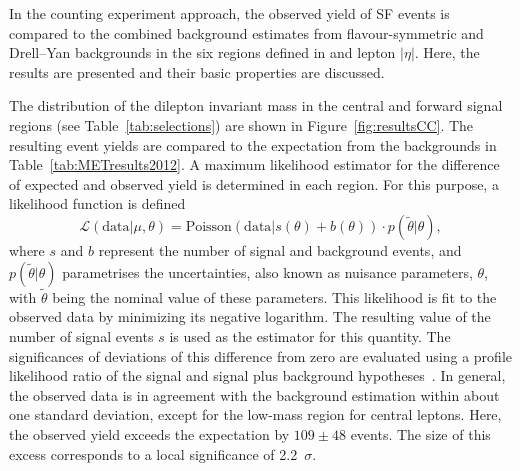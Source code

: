 \label{sec:counting}
In the counting experiment approach, the observed yield of SF events is compared to the combined background estimates from flavour-symmetric and Drell--Yan backgrounds in the six regions defined in \mll and lepton $|\eta|$. Here, the results are presented and their basic properties are discussed.

The distribution of the dilepton invariant mass in the central and forward signal regions (see Table~\ref{tab:selections}) are shown in Figure~\ref{fig:resultsCC}. The resulting event yields are compared to the expectation from the backgrounds in Table~\ref{tab:METresults2012}. A maximum likelihood estimator for the difference of expected and observed yield is determined in each region. For this purpose, a likelihood function is defined~\cite{HiggsTool1}
\begin{equation}
\label{eq:ML}
\mathcal{L}(\text{data}|\mu,\theta) = \text{Poisson}\left(\text{data}| s\left(\theta\right) + b\left(\theta\right)\right)\cdot p\left(\tilde{\theta}|\theta\right),
\end{equation}
where $s$ and $b$ represent the number of signal and background events, and $p(\tilde{\theta}|\theta)$ parametrises the uncertainties, also known as nuisance parameters, $\theta$, with $\tilde{\theta}$ being the nominal value of these parameters. This likelihood is fit to the observed data by minimizing its negative logarithm. The resulting value of the number of signal events $s$ is used as the estimator for this quantity. The significances of deviations of this difference from zero are evaluated using a profile likelihood ratio of the signal and signal plus background hypotheses~\cite{HiggsTool1}. In general, the observed data is in agreement with the background estimation within about one standard deviation, except for the low-mass region for central leptons. Here, the observed yield exceeds the expectation by $109\pm48$ events. The size of this excess corresponds to a local significance of 2.2~$\sigma$.  
